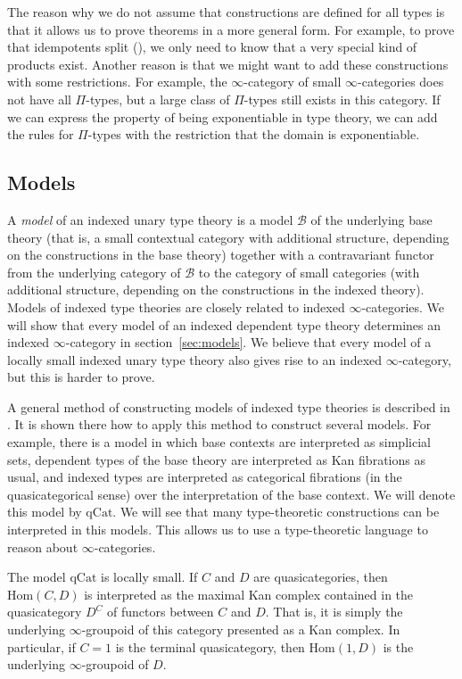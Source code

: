 \documentclass[reqno]{mscs}
\newcommand{\fs}[1]{\mathrm{#1}}
\newcommand{\cat}[1]{\mathcal{#1}}
\newcommand{\Hom}{\fs{Hom}}
\newcommand{\qCat}{\fs{qCat}}
\numberwithin{figure}{section}
\begin{document}
The reason why we do not assume that constructions are defined for all types is that it allows us to prove theorems in a more general form.
For example, to prove that idempotents split (), we only need to know that a very special kind of products exist.
Another reason is that we might want to add these constructions with some restrictions.
For example, the $\infty$-category of small $\infty$-categories does not have all $\Pi$-types, but a large class of $\Pi$-types still exists in this category.
If we can express the property of being exponentiable in type theory, we can add the rules for $\Pi$-types with the restriction that the domain is exponentiable.

\subsection{Models}
\label{sec:unary-models}

A \emph{model} of an indexed unary type theory is a model $\cat{B}$ of the underlying base theory (that is, a small contextual category with additional structure, depending on the constructions in the base theory)
together with a contravariant functor from the underlying category of $\cat{B}$ to the category of small categories (with additional structure, depending on the constructions in the indexed theory).
Models of indexed type theories are closely related to indexed $\infty$-categories.
We will show that every model of an indexed dependent type theory determines an indexed $\infty$-category in section~\ref{sec:models}.
We believe that every model of a locally small indexed unary type theory also gives rise to an indexed $\infty$-category, but this is harder to prove.

A general method of constructing models of indexed type theories is described in \cite{indexed-models}.
It is shown there how to apply this method to construct several models.
For example, there is a model in which base contexts are interpreted as simplicial sets, dependent types of the base theory are interpreted as Kan fibrations as usual,
and indexed types are interpreted as categorical fibrations (in the quasicategorical sense) over the interpretation of the base context.
We will denote this model by $\qCat$.
We will see that many type-theoretic constructions can be interpreted in this models.
This allows us to use a type-theoretic language to reason about $\infty$-categories.

The model $\qCat$ is locally small.
If $C$ and $D$ are quasicategories, then $\Hom(C,D)$ is interpreted as the maximal Kan complex contained in the quasicategory $D^C$ of functors between $C$ and $D$.
That is, it is simply the underlying $\infty$-groupoid of this category presented as a Kan complex.
In particular, if $C = 1$ is the terminal quasicategory, then $\Hom(1,D)$ is the underlying $\infty$-groupoid of $D$.
\end{document}
